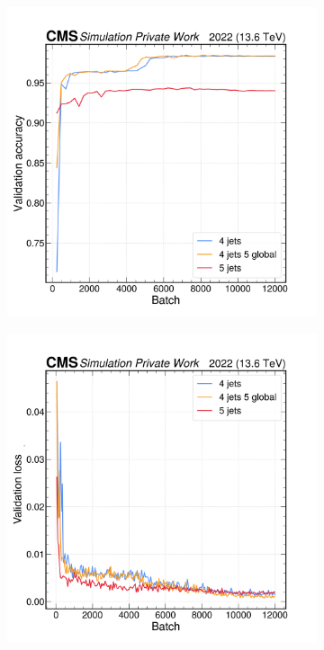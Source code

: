 \begin{figure}[h!]
    \centering
    \begin{subfigure}[b]{0.45\textwidth}
        \centering
        \includegraphics[width=\textwidth]{Images/5.SPANet/comp_4_4j5_5.png}
    \end{subfigure}
    \hfill
    \begin{subfigure}[b]{0.45\textwidth}
        \centering
        \includegraphics[width=\textwidth]{Images/5.SPANet/validation_loss.png}

\end{subfigure}
\end{figure}
